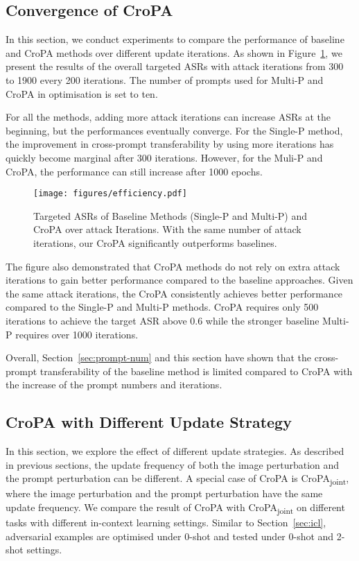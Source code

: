 \subsection{Convergence of CroPA}
\label{sec: converge}
In this section, we conduct experiments to compare the performance of baseline and CroPA methods over different update iterations. As shown in Figure~\ref{fig:convergence},  we present the results of the overall targeted ASRs with attack iterations from 300 to 1900 every 200 iterations. The number of prompts used for Multi-P and CroPA in optimisation is set to ten.

For all the methods, adding more attack iterations can increase ASRs at the beginning, but the performances eventually converge.  For the Single-P method, the improvement in cross-prompt transferability by using more iterations has quickly become marginal after 300 iterations. However, for the Muli-P and CroPA, the performance can still increase after 1000 epochs. 

\begin{figure}[t]
    \centering
    \texttt{[image: figures/efficiency.pdf]} \vspace{-0.3cm}
    \caption{Targeted ASRs of Baseline Methods (Single-P and Multi-P) and CroPA over attack Iterations. With the same number of attack iterations, our CroPA significantly outperforms baselines.} 
    \label{fig:convergence}
    \vspace{-0.3cm}
\end{figure}

The figure also demonstrated that CroPA methods do not rely on extra attack iterations to gain better performance compared to the baseline approaches. Given the same attack iterations, the CroPA consistently achieves better performance compared to the Single-P and Multi-P methods. CroPA requires only 500 iterations to achieve the target ASR above 0.6 while the stronger baseline Multi-P requires over 1000 iterations. 

Overall, Section~\ref{sec:prompt-num} and this section have shown that the cross-prompt transferability of the baseline method is limited compared to CroPA with the increase of the prompt numbers and iterations. 

\subsection{CroPA with Different Update Strategy}
In this section, we explore the effect of different update strategies. As described in previous sections, the update frequency of both the image perturbation and the prompt perturbation can be different. A special case of CroPA is CroPA\textsubscript{joint}, where the image perturbation and the prompt perturbation have the same update frequency. We compare the result of CroPA with CroPA\textsubscript{joint} on different tasks with different in-context learning settings. Similar to Section~\ref{sec:icl}, adversarial examples are optimised under 0-shot and tested under 0-shot and 2-shot settings.

